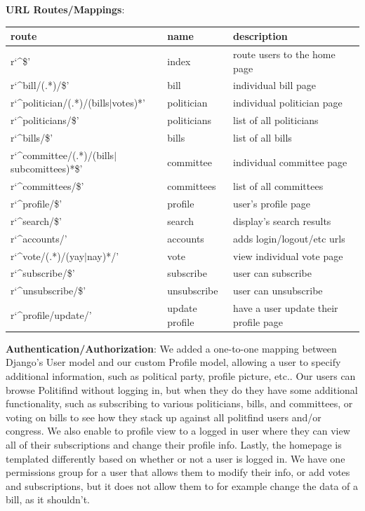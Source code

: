 \documentclass{article}
\newcommand{\n}{\noindent}
\begin{document}
\n\textbf{URL Routes/Mappings}: 
\begin{center}
\begin{tabular}{ l | l | l }
route & name & description \\
\hline
r`\^{}\$' & index & route users to the home page \\
r`\^{}bill/(.*)/\$' & bill & individual bill page\\
r`\^{}politician/(.*)/(bills$\mid$votes)*' & politician & individual politician page\\
r`\^{}politicians/\$' & politicians & list of all politicians\\
r`\^{}bills/\$' & bills & list of all bills\\
r`\^{}committee/(.*)/(bills$\mid$subcomittees)*\$' & committee & individual committee page\\
r`\^{}committees/\$' & committees & list of all committees\\
r`\^{}profile/\$' & profile & user's profile page\\
r`\^{}search/\$' & search & display's search results\\
r`\^{}accounts/' & accounts & adds login/logout/etc urls\\
r`\^{}vote/(.*)/(yay$\mid$nay)*/' & vote & view individual vote page\\
r`\^{}subscribe/\$' & subscribe & user can subscribe\\
r`\^{}unsubscribe/\$' & unsubscribe & user can unsubscribe\\
r`\^{}profile/update/' & update profile & have a user update their profile page\\
\end{tabular}
\end{center}

\n\textbf{Authentication/Authorization}: We added a one-to-one mapping between Django's User model and our custom Profile model, allowing a user to specify additional information, such as political party, profile picture, etc.. Our users can browse Politifind without logging in, but when they do they have some additional functionality, such as subscribing to various politicians, bills, and committees, or voting on bills to see how they stack up against all politfind users and/or congress. We also enable to profile view to a logged in user where they can view all of their subscriptions and change their profile info. Lastly, the homepage is templated differently based on whether or not a user is logged in. We have one permissions group for a user that allows them to modify their info, or add votes and subscriptions, but it does not allow them to for example change the data of a bill, as it shouldn't. \\
\end{document}
